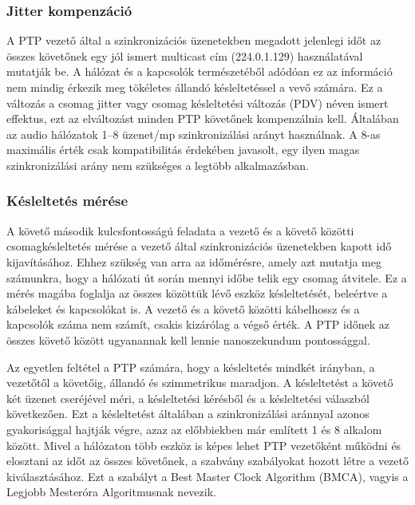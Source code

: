\subsubsection{Jitter kompenzáció}
A PTP vezető által a szinkronizációs üzenetekben megadott jelenlegi időt az összes követőnek egy jól ismert multicast
cím (224.0.1.129) használatával mutatják be. 
A hálózat és a kapcsolók természetéből adódóan ez az információ nem mindig érkezik meg tökéletes állandó
késleltetéssel a vevő számára. 
Ez a változás a csomag jitter vagy csomag késleltetési változás (PDV) néven ismert effektus,
ezt az elváltozást minden PTP követőnek kompenzálnia kell. 
Általában az audio hálózatok 1--8 üzenet/mp szinkronizálási arányt
használnak. A 8-as maximális érték csak kompatibilitás érdekében javasolt, egy ilyen
magas szinkronizálási arány nem szükséges a legtöbb alkalmazásban.
\subsubsection{Késleltetés mérése}
A követő második kulcsfontosságú feladata a vezető és a követő közötti
csomagkésleltetés mérése a vezető által szinkronizációs üzenetekben kapott
idő kijavításához. Ehhez szükség van arra az időmérésre, amely azt mutatja meg számunkra,
hogy a hálózati út során mennyi időbe telik egy csomag átvitele.
Ez a mérés magába foglalja az összes közöttük lévő
eszköz késleltetését, beleértve a kábeleket és kapcsolókat is. 
A vezető és a követő közötti kábelhossz és a kapcsolók száma nem számít, csakis kizárólag a végső érték.
A PTP időnek az összes követő között ugyanannak kell lennie nanoszekundum pontossággal.

Az egyetlen feltétel a PTP számára, hogy a késleltetés mindkét irányban, a vezetőtől a
követőig, állandó és szimmetrikus maradjon.
A késleltetést a követő két üzenet cseréjével méri, a késleltetési kérésből és a késleltetési válaszból következően.
Ezt a késleltetést általában a szinkronizálási aránnyal azonos gyakorisággal hajtják végre, 
azaz az előbbiekben már említett 1 és 8 alkalom között.
Mivel a hálózaton több eszköz is képes lehet PTP vezetőként működni és elosztani
az időt az összes követőnek, a szabvány szabályokat hozott létre a vezető
kiválasztásához. Ezt a szabályt a Best Master Clock Algorithm (BMCA), vagyis a
Legjobb Mesteróra Algoritmusnak nevezik. 

